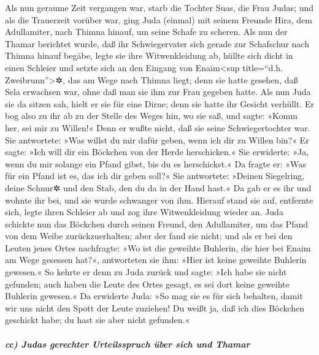  Als nun geraume Zeit vergangen war, starb die Tochter
Suas, die Frau Judas; und als die Trauerzeit vorüber war, ging Juda
(einmal) mit seinem Freunde Hira, dem Adullamiter, nach Thimna hinauf,
um seine Schafe zu scheren.  Als nun der Thamar berichtet
wurde, daß ihr Schwiegervater sich gerade zur Schafschur nach Thimna
hinauf begäbe,  legte sie ihre Witwenkleidung ab, hüllte
sich dicht in einen Schleier und setzte sich an den Eingang von
Enaim\textless sup title=``d.h. Zweibrunn''\textgreater✲, das am Wege
nach Thimna liegt; denn sie hatte gesehen, daß Sela erwachsen war, ohne
daß man sie ihm zur Frau gegeben hatte.  Als nun Juda sie
da sitzen sah, hielt er sie für eine Dirne; denn sie hatte ihr Gesicht
verhüllt.  Er bog also zu ihr ab zu der Stelle des Weges
hin, wo sie saß, und sagte: »Komm her, sei mir zu Willen!« Denn er wußte
nicht, daß sie seine Schwiegertochter war. Sie antwortete: »Was willst
du mir dafür geben, wenn ich dir zu Willen bin?«  Er
sagte: »Ich will dir ein Böckchen von der Herde herschicken.« Sie
erwiderte: »Ja, wenn du mir solange ein Pfand gibst, bis du es
herschickst.«  Da fragte er: »Was für ein Pfand ist es,
das ich dir geben soll?« Sie antwortete: »Deinen Siegelring, deine
Schnur✲ und den Stab, den du da in der Hand hast.« Da gab er es ihr und
wohnte ihr bei, und sie wurde schwanger von ihm.  Hierauf
stand sie auf, entfernte sich, legte ihren Schleier ab und zog ihre
Witwenkleidung wieder an.  Juda schickte nun das Böckchen
durch seinen Freund, den Adullamiter, um das Pfand von dem Weibe
zurückzuerhalten; aber der fand sie nicht;  und als er
bei den Leuten jenes Ortes nachfragte: »Wo ist die geweihte Buhlerin,
die hier bei Enaim am Wege gesessen hat?«, antworteten sie ihm: »Hier
ist keine geweihte Buhlerin gewesen.«  So kehrte er denn
zu Juda zurück und sagte: »Ich habe sie nicht gefunden; auch haben die
Leute des Ortes gesagt, es sei dort keine geweihte Buhlerin gewesen.«
 Da erwiderte Juda: »So mag sie es für sich behalten,
damit wir uns nicht den Spott der Leute zuziehen! Du weißt ja, daß ich
dies Böckchen geschickt habe; du hast sie aber nicht gefunden.«

\hypertarget{cc-judas-gerechter-urteilsspruch-uxfcber-sich-und-thamar}{%
\subparagraph{cc) Judas gerechter Urteilsspruch über sich und
Thamar}\label{cc-judas-gerechter-urteilsspruch-uxfcber-sich-und-thamar}}

